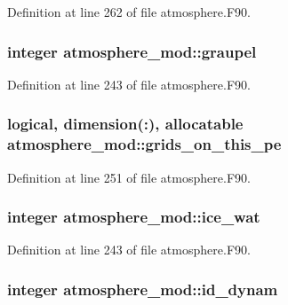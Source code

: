 Definition at line 262 of file atmosphere.\-F90.

\subsubsection[{graupel}]{\setlength{\rightskip}{0pt plus 5cm}integer atmosphere\-\_\-mod\-::graupel\hspace{0.3cm}{\ttfamily [private]}}\label{classatmosphere__mod_a6af183d451e4d59e5cd97150b69e9ec7}


Definition at line 243 of file atmosphere.\-F90.

\subsubsection[{grids\-\_\-on\-\_\-this\-\_\-pe}]{\setlength{\rightskip}{0pt plus 5cm}logical, dimension(\-:), allocatable atmosphere\-\_\-mod\-::grids\-\_\-on\-\_\-this\-\_\-pe\hspace{0.3cm}{\ttfamily [private]}}\label{classatmosphere__mod_ad80223528e58b40110f8a1ffdd3b9aad}


Definition at line 251 of file atmosphere.\-F90.

\subsubsection[{ice\-\_\-wat}]{\setlength{\rightskip}{0pt plus 5cm}integer atmosphere\-\_\-mod\-::ice\-\_\-wat\hspace{0.3cm}{\ttfamily [private]}}\label{classatmosphere__mod_a9d5b133b6c0010773c3f475af7e879fc}


Definition at line 243 of file atmosphere.\-F90.

\subsubsection[{id\-\_\-dynam}]{\setlength{\rightskip}{0pt plus 5cm}integer atmosphere\-\_\-mod\-::id\-\_\-dynam\hspace{0.3cm}{\ttfamily [private]}}\label{classatmosphere__mod_ac1b450b5b014a927fb0456a5b8e73710}


